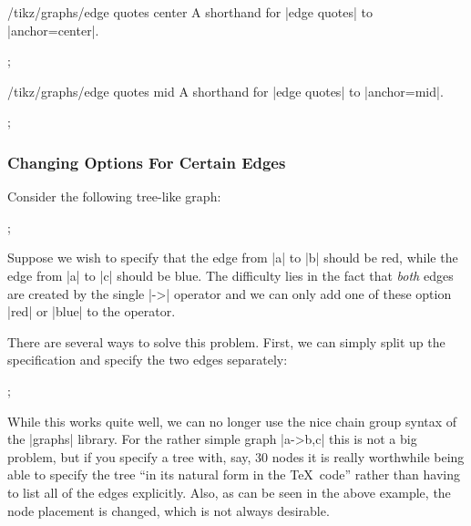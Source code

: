 \begin{key}{/tikz/graphs/edge quotes center}
    A shorthand for |edge quotes| to |anchor=center|.
\begin{codeexample}[preamble={\usetikzlibrary{graphs,quotes}}]
\tikz {};
\end{codeexample}
\end{key}

\begin{key}{/tikz/graphs/edge quotes mid}
    A shorthand for |edge quotes| to |anchor=mid|.
\begin{codeexample}[preamble={\usetikzlibrary{graphs,quotes}}]
\tikz {};
\end{codeexample}
\end{key}


\subsubsection{Changing Options For Certain Edges}

Consider the following tree-like graph:
%
\begin{codeexample}[preamble={\usetikzlibrary{graphs}}]
\tikz {};
\end{codeexample}

Suppose we wish to specify that the edge from |a| to |b| should be red, while
the edge from |a| to |c| should be blue. The difficulty lies in the fact that
\emph{both} edges are created by the single |->| operator and we can only add
one of these option |red| or |blue| to the operator.

There are several ways to solve this problem. First, we can simply split up the
specification and specify the two edges separately:
%
\begin{codeexample}[preamble={\usetikzlibrary{graphs}}]
\tikz {};
\end{codeexample}
%
While this works quite well, we can no longer use the nice chain group syntax
of the |graphs| library. For the rather simple graph |a->{b,c}| this is not a
big problem, but if you specify a tree with, say, 30 nodes it is really
worthwhile being able to specify the tree ``in its natural form in the \TeX\
code'' rather than having to list all of the edges explicitly. Also, as can be
seen in the above example, the node placement is changed, which is not always
desirable.

